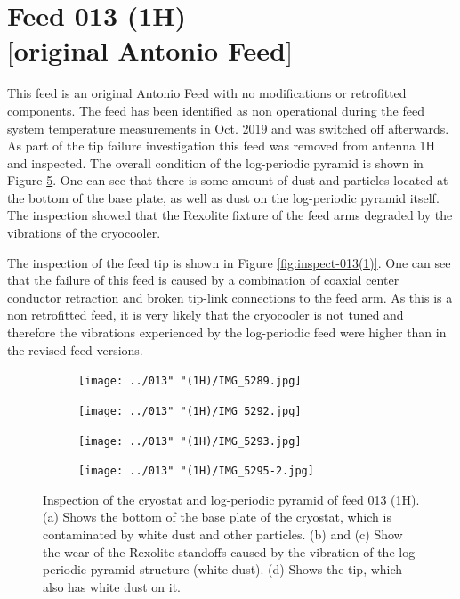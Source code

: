 \documentclass[12pt,a4paper,oneside]{article}
\begin{document}
\section{Feed 013 (1H)\\$[$original Antonio Feed$]$}
\label{sec:4}

This feed is an original Antonio Feed with no modifications or retrofitted components. The feed has been identified as non operational during the feed system temperature measurements in Oct. 2019 and was switched off afterwards. As part of the tip failure investigation this feed was removed from antenna 1H and inspected. The overall condition of the log-periodic pyramid is shown in Figure \ref{fig:inspect-013(0)}. One can see that there is some amount of dust and particles located at the bottom of the base plate, as well as dust on the log-periodic pyramid itself. The inspection showed that the Rexolite fixture of the feed arms degraded by the vibrations of the cryocooler.

The inspection of the feed tip is shown in Figure \ref{fig:inspect-013(1)}. One can see that the failure of this feed is caused by a combination of coaxial center conductor retraction and broken tip-link connections to the feed arm. As this is a non retrofitted feed, it is very likely that the cryocooler is not tuned and therefore the vibrations experienced by the log-periodic feed were higher than in the revised feed versions.


\newpage
%
\begin{figure}[H]
    \centering
        \begin{subfigure}[t]{0.475\textwidth}
        \centering
        \texttt{[image: ../013" "(1H)/IMG\_5289.jpg]}
        \caption{}
        \label{fig:}
   	 \end{subfigure}
        \begin{subfigure}[t]{0.475\textwidth}
        \centering
        \texttt{[image: ../013" "(1H)/IMG\_5292.jpg]}
        \caption{}
        \label{fig:}
   	\end{subfigure}
   
 	\vspace{1mm}
   
        \begin{subfigure}[t]{0.475\textwidth}
        \centering
        \texttt{[image: ../013" "(1H)/IMG\_5293.jpg]}
        \caption{}
        \label{fig:}
   	 \end{subfigure}
        \begin{subfigure}[t]{0.475\textwidth}
        \centering
        \texttt{[image: ../013" "(1H)/IMG\_5295-2.jpg]}
        \caption{}
        \label{fig:}
  	\end{subfigure}  
    \caption{Inspection of the cryostat and log-periodic pyramid of feed 013 (1H). (a) Shows the bottom of the base plate of the cryostat, which is contaminated by white dust and other particles. (b) and (c) Show the wear of the Rexolite standoffs caused by the vibration of the log-periodic pyramid structure (white dust). (d) Shows the tip, which also has white dust on it. }
    \label{fig:inspect-013(0)}
\end{figure}
\end{document}
